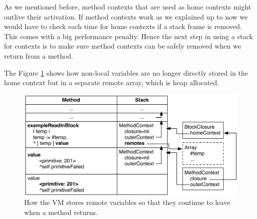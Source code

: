 \documentclass[a4paper,10pt,twoside]{book}
\begin{document}
As we mentioned before, method contexts that are used as home contexts might outlive their activation.
If method contexts work as we explained up to now we would have to check each time for home contexts if a stack frame is removed.
This comes with a big performance penalty.
Hence the next step in using a stack for contexts is to make sure method contexts can be safely removed when we return from a method.

The Figure \ref{fig:BlockWithMethodContext} shows how non-local variables
are no longer directly stored in the home context but in a separate
remote array, which is heap allocated.

\begin{figure}
  \begin{center}
    \includegraphics[width=\textwidth]{BlockWithMethodContext}
    \caption{How the VM stores remote variables so that they continue to leave when a method returns.\label{fig:BlockWithMethodContext}}
  \end{center}
\end{figure}




\end{document}
